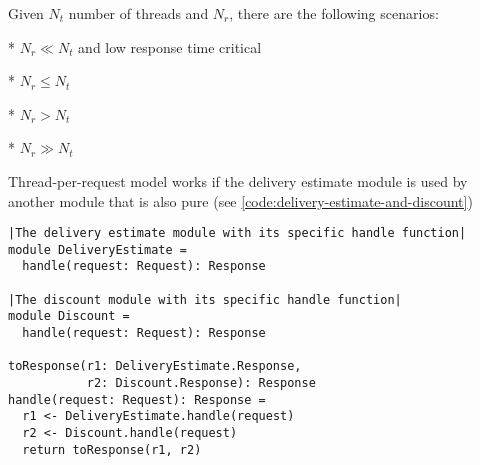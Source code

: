 Given $N_{t}$ number of threads and $N_{r}$, there are the following scenarios:

* $N_{r} \ll N_{t}$ and low response time critical

* $N_{r} \le N_{t}$ 

* $N_{r} > N_{t}$

* $N_{r} \gg N_{t}$

Thread-per-request model works if the delivery estimate module is used by another module that is also pure (see \autoref{code:delivery-estimate-and-discount})

\begin{lstlisting}[caption={Delivery and discount}, label={code:delivery-estimate-and-discount}, language=Pseudo, escapechar=|]
|The delivery estimate module with its specific handle function|
module DeliveryEstimate =
  handle(request: Request): Response

|The discount module with its specific handle function|
module Discount =
  handle(request: Request): Response

toResponse(r1: DeliveryEstimate.Response,
           r2: Discount.Response): Response
handle(request: Request): Response = 
  r1 <- DeliveryEstimate.handle(request)
  r2 <- Discount.handle(request)
  return toResponse(r1, r2)

\end{lstlisting}


\printbibliography

